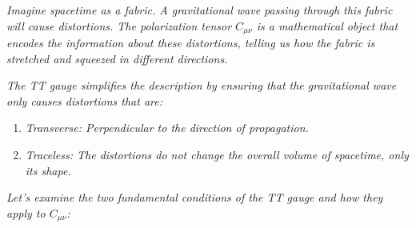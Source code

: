 \emph{Imagine spacetime as a fabric. A gravitational wave passing through this fabric will cause distortions. The polarization tensor $C_{\mu\nu}$ is a mathematical object that encodes the information about these distortions, telling us how the fabric is stretched and squeezed in different directions.}

\emph{The TT gauge simplifies the description by ensuring that the gravitational wave only causes distortions that are:}
\begin{enumerate}
    \item \emph{Transverse: Perpendicular to the direction of propagation.}
    \item \emph{Traceless: The distortions do not change the overall volume of spacetime, only its shape.}
\end{enumerate}

\emph{Let's examine the two fundamental conditions of the TT gauge and how they apply to $C_{\mu\nu}$:}

